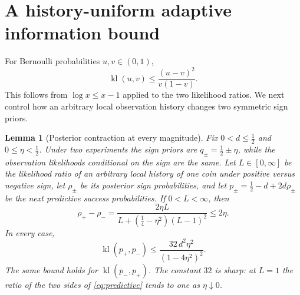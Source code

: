 \documentclass[11pt,a4paper]{article}
\newtheorem{lemma}[theorem]{Lemma}
\theoremstyle{definition}
\newcommand{\kl}{\operatorname{kl}}
\begin{document}
\section{A history-uniform adaptive information bound}\label{sec:lower}
For Bernoulli probabilities $u,v\in(0,1)$,
\begin{equation}\label{eq:ber-kl}
 \kl(u,v)\le\frac{(u-v)^2}{v(1-v)}.
\end{equation}
This follows from $\log x\le x-1$ applied to the two likelihood ratios.
We next control how an arbitrary local observation history changes two
symmetric sign priors.

\begin{lemma}[Posterior contraction at every magnitude]\label{lem:posterior}
Fix $0<d\le\tfrac12$ and $0\le\eta<\tfrac12$. Under two experiments the sign priors are
$q_\pm=\tfrac12\pm\eta$, while the observation likelihoods conditional on the sign are the
same. Let $L\in[0,\infty]$ be the likelihood ratio of an arbitrary local history of one
coin under positive versus negative sign, let $\rho_\pm$ be its posterior sign
probabilities, and let $p_\pm=\tfrac12-d+2d\rho_\pm$ be the next predictive success
probabilities. If $0<L<\infty$, then
\begin{equation}\label{eq:posterior}
\rho_+-\rho_-=\frac{2\eta L}{L+(\tfrac14-\eta^2)(L-1)^2}\le2\eta .
\end{equation}
In every case,
\begin{equation}\label{eq:predictive}
\operatorname{kl}(p_+,p_-)\le\frac{32\,d^2\eta^2}{(1-4\eta^2)^2}.
\end{equation}
The same bound holds for $\operatorname{kl}(p_-,p_+)$. The constant $32$ is sharp: at $L=1$ the ratio of the two sides of
\eqref{eq:predictive} tends to one as $\eta\downarrow0$.
\end{lemma}
\end{document}
